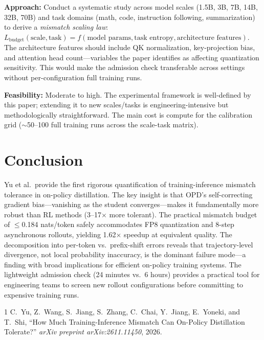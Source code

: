 \documentclass[11pt,a4paper]{article}
\begin{document}
\textbf{Approach:} Conduct a systematic study across model scales (1.5B, 3B, 7B, 14B, 32B, 70B) and task domains (math, code, instruction following, summarization) to derive a \emph{mismatch scaling law}: $L_{\mathrm{budget}}(\text{scale}, \text{task}) = f(\text{model params}, \text{task entropy}, \text{architecture features})$. The architecture features should include QK normalization, key-projection bias, and attention head count---variables the paper identifies as affecting quantization sensitivity. This would make the admission check transferable across settings without per-configuration full training runs.

\textbf{Feasibility:} Moderate to high. The experimental framework is well-defined by this paper; extending it to new scales/tasks is engineering-intensive but methodologically straightforward. The main cost is compute for the calibration grid ($\sim$50--100 full training runs across the scale-task matrix).

\section{Conclusion}
Yu et al.\ provide the first rigorous quantification of training-inference mismatch tolerance in on-policy distillation. The key insight is that OPD's self-correcting gradient bias---vanishing as the student converges---makes it fundamentally more robust than RL methods (3--17$\times$ more tolerant). The practical mismatch budget of $\leq$0.184 nats/token safely accommodates FP8 quantization and 8-step asynchronous rollouts, yielding 1.62$\times$ speedup at equivalent quality. The decomposition into per-token vs.\ prefix-shift errors reveals that trajectory-level divergence, not local probability inaccuracy, is the dominant failure mode---a finding with broad implications for efficient on-policy training systems. The lightweight admission check (24 minutes vs.\ 6 hours) provides a practical tool for engineering teams to screen new rollout configurations before committing to expensive training runs.

\begin{thebibliography}{1}
C.~Yu, Z.~Wang, S.~Jiang, S.~Zhang, C.~Chai, Y.~Jiang, E.~Yoneki, and T.~Shi,
``How Much Training-Inference Mismatch Can On-Policy Distillation Tolerate?''
\textit{arXiv preprint arXiv:2611.11450}, 2026.
\end{thebibliography}
\end{document}

